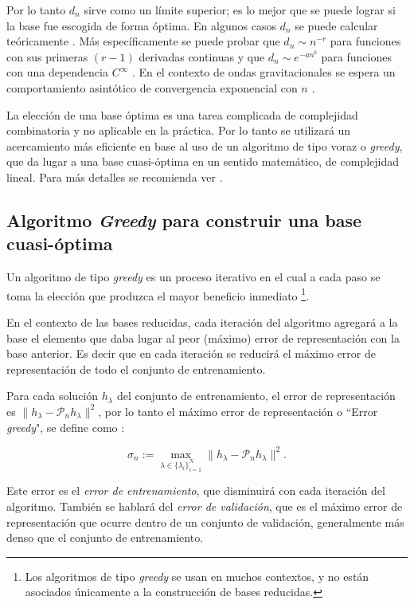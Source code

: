 Por lo tanto $d_n$ sirve como un límite superior; es lo mejor que se puede lograr si la base fue escogida de forma óptima.
En algunos casos $d_n$ se puede calcular teóricamente \cite{MAGARILILYAEV200197}. Más específicamente se puede probar que $d_n \sim n^{-r}$ para funciones con sus primeras $(r-1)$ derivadas continuas y que $d_n \sim e^{-an^b}$ para funciones con una dependencia $C^{\infty}$  \cite{articleg}. En el contexto de ondas gravitacionales se espera un comportamiento asintótico de convergencia exponencial con $n$ \citep{PhysRevX.4.031006, Herrmann:2012xpx}.

La elección de una base óptima es una tarea complicada de complejidad combinatoria y no aplicable en la práctica. Por lo tanto se utilizará un acercamiento más eficiente en base al uso de un algoritmo de tipo voraz o \textit{greedy}, que da lugar a una base cuasi-óptima en un sentido matemático, de complejidad lineal. Para más detalles se recomienda ver \cite{Tiglio:2021ysj}.

\subsection{Algoritmo \textit{Greedy} para construir una base cuasi-óptima}

Un algoritmo de tipo \textit{greedy} es un proceso iterativo en el cual a cada paso se toma la elección que produzca el mayor beneficio inmediato \footnote{Los algoritmos de tipo \textit{greedy} se usan en muchos contextos, y no están asociados únicamente a la construcción de bases reducidas.}.

En el contexto de las bases reducidas, cada iteración del algoritmo agregará a la base el elemento que daba lugar al peor (máximo) error de representación con la base anterior. Es decir que en cada iteración se reducirá el máximo error de representación de todo el conjunto de entrenamiento.


Para cada solución $h_{\lambda}$ del conjunto de entrenamiento, el error de representación es $\| h_{\lambda} - \mathcal{P}_nh_{\lambda} \|^2$, por lo tanto el máximo error de representación o ``Error \textit{greedy}", se define como :

\begin{equation}
\sigma_n := \max_{\lambda \in  \{ \lambda_{i}\}_{i=1}^N } \| h_{\lambda} - \mathcal{P}_nh_{\lambda} \|^2.
\end{equation}

Este error es el \textit{error de entrenamiento}, que disminuirá con cada iteración del algoritmo. También se hablará del \textit{error de validación}, que es el máximo error de representación que ocurre dentro de un conjunto de validación, generalmente más denso que el conjunto de entrenamiento.

